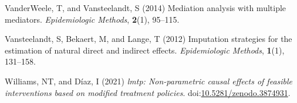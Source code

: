 \documentclass[
  single column]{article}
\newlength{\cslhangindent}
\newenvironment{CSLReferences}[2] %
 {\begin{list}{}{%
  \setlength{\itemindent}{0pt}
  \setlength{\leftmargin}{0pt}
  \setlength{\parsep}{0pt}
  \ifodd #1
   \setlength{\leftmargin}{\cslhangindent}
   \setlength{\itemindent}{-1\cslhangindent}
  \fi
  \setlength{\itemsep}{#2\baselineskip}}}
 {\end{list}}
\begin{document}
\begin{CSLReferences}{1}{0}
VanderWeele, T, and Vansteelandt, S (2014) Mediation analysis with
multiple mediators. \emph{Epidemiologic Methods}, \textbf{2}(1),
95--115.

Vansteelandt, S, Bekaert, M, and Lange, T (2012) Imputation strategies
for the estimation of natural direct and indirect effects.
\emph{Epidemiologic Methods}, \textbf{1}(1), 131--158.

Williams, NT, and Díaz, I (2021) \emph{{l}mtp: Non-parametric causal
effects of feasible interventions based on modified treatment policies}.
doi:\href{https://doi.org/10.5281/zenodo.3874931}{10.5281/zenodo.3874931}.

\end{CSLReferences}
\end{document}
